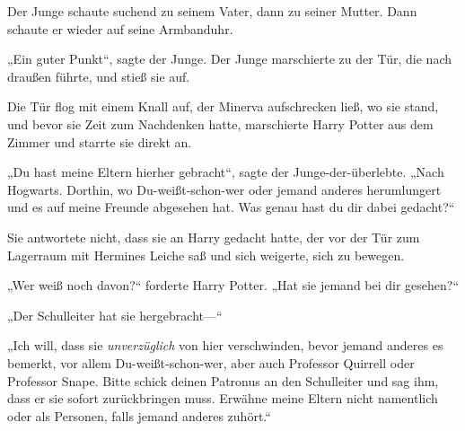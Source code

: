 Der Junge schaute suchend zu seinem Vater, dann zu seiner Mutter. Dann schaute er wieder auf seine Armbanduhr.


„Ein guter Punkt“, sagte der Junge. Der Junge marschierte zu der Tür, die nach draußen führte, und stieß sie auf.

\later

Die Tür flog mit einem Knall auf, der Minerva aufschrecken ließ, wo sie stand, und bevor sie Zeit zum Nachdenken hatte, marschierte Harry Potter aus dem Zimmer und starrte sie direkt an.

„Du hast meine Eltern hierher gebracht“, sagte der Junge-der-überlebte.
„Nach Hogwarts. Dorthin, wo Du-weißt-schon-wer oder jemand anderes herumlungert und es auf meine Freunde abgesehen hat. Was genau hast du dir dabei gedacht?“

Sie antwortete nicht, dass sie an Harry gedacht hatte, der vor der Tür zum Lagerraum mit Hermines Leiche saß und sich weigerte, sich zu bewegen.

„Wer weiß noch davon?“ forderte Harry Potter. „Hat sie jemand bei dir gesehen?“

„Der Schulleiter hat sie hergebracht—“

„Ich will, dass sie \emph{unverzüglich} von hier verschwinden, bevor jemand anderes es bemerkt, vor allem Du-weißt-schon-wer, aber auch Professor Quirrell oder Professor Snape. Bitte schick deinen Patronus an den Schulleiter und sag ihm, dass er sie sofort zurückbringen muss. Erwähne meine Eltern nicht namentlich oder als Personen, falls jemand anderes zuhört.“

